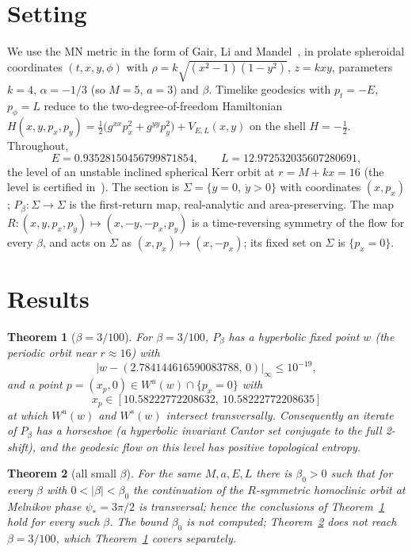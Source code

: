 \documentclass[11pt]{amsart}
\newtheorem{theorem}{Theorem}
\theoremstyle{remark}\newtheorem*{remark}{Remark}
\begin{document}
\section{Setting}
We use the MN metric in the form of Gair, Li and Mandel~\cite[eqs.~(2)--(5)]{GLM}, in prolate spheroidal coordinates
$(t,x,y,\phi)$ with $\rho=k\sqrt{(x^2-1)(1-y^2)}$, $z=kxy$, parameters $k=4$, $\alpha=-1/3$ (so $M=5$, $a=3$) and
$\beta$. Timelike geodesics with $p_t=-E$, $p_\phi=L$ reduce to the two-degree-of-freedom Hamiltonian
$H(x,y,p_x,p_y)=\tfrac12\big(g^{xx}p_x^2+g^{yy}p_y^2\big)+V_{E,L}(x,y)$ on the shell $H=-\tfrac12$. Throughout,
\[ E=0.93528150456799871854,\qquad L=12.972532035607280691, \]
the level of an unstable inclined spherical Kerr orbit at $r=M+kx=16$ (the level is certified in~\cite{MelRes}).
The section is $\Sigma=\{y=0,\ \dot y>0\}$ with coordinates $(x,p_x)$; $P_\beta:\Sigma\to\Sigma$ is the first-return
map, real-analytic and area-preserving. The map $R:(x,y,p_x,p_y)\mapsto(x,-y,-p_x,p_y)$ is a time-reversing symmetry
of the flow for every $\beta$, and acts on $\Sigma$ as $(x,p_x)\mapsto(x,-p_x)$; its fixed set on $\Sigma$ is
$\{p_x=0\}$.

\section{Results}
\begin{theorem}[$\beta=3/100$]\label{thm:1}
For $\beta=3/100$, $P_\beta$ has a hyperbolic fixed point $w$ (the periodic orbit near $r\approx16$) with
\[ |w-(2.784144616590083788,\,0)|_\infty\le10^{-19}, \]
and a point $p=(x_p,0)\in W^u(w)\cap\{p_x=0\}$ with
\[ x_p\in[10.58222772208632,\ 10.58222772208635] \]
at which $W^u(w)$ and $W^s(w)$ intersect transversally. Consequently
an iterate of $P_\beta$ has a horseshoe (a hyperbolic invariant Cantor set conjugate to the full 2-shift), and the
geodesic flow on this level has positive topological entropy.
\end{theorem}

\begin{theorem}[all small $\beta$]\label{thm:2}
For the same $M,a,E,L$ there is $\beta_0>0$ such that for every $\beta$ with $0<|\beta|<\beta_0$ the continuation of the
$R$-symmetric homoclinic orbit at Melnikov phase $\psi_*=3\pi/2$ is transversal; hence the conclusions of
Theorem~\ref{thm:1} hold for every such $\beta$. The bound $\beta_0$ is not computed; Theorem~\ref{thm:2} does not
reach $\beta=3/100$, which Theorem~\ref{thm:1} covers separately.
\end{theorem}
\end{document}

